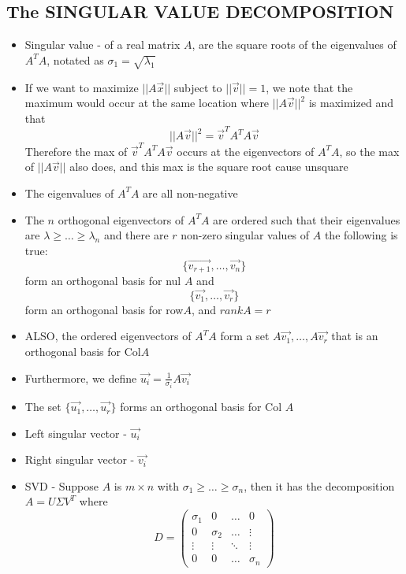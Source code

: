 \documentclass{article}
\begin{document}
\subsection{The SINGULAR VALUE DECOMPOSITION}
\begin{itemize}
    \item Singular value - of a real matrix \(A\), are the square roots of the eigenvalues of \(A^TA\), notated as \(\sigma_1=\sqrt{\lambda_1}\)
    \item If we want to maximize \(||A\vec{x}||\) subject to \(||\vec{v}||=1\), we note that the maximum would occur at the same location where \(||A\vec{v}||^2\) is maximized and that 
    \[||A\vec{v}||^2=\vec{v}^TA^TA\vec{v}\] Therefore the max of \(\vec{v}^TA^TA\vec{v}\) occurs at the eigenvectors of \(A^TA\), so the max of \(||A\vec{v}||\) also does, and this max is the square root cause unsquare
    \item The eigenvalues of \(A^TA\) are all non-negative 
    \item The \(n\) orthogonal eigenvectors of \(A^TA\) are ordered such that their eigenvalues are \(\lambda\geq\dots\geq\lambda_n\) and there are \(r\) non-zero singular values of \(A\) the following is true:
    \[\{\vec{v_{r+1}},\dots,\vec{v_{n}}\}\] form an orthogonal basis for nul \(A\) and \[\{\vec{v_{1}},\dots,\vec{v_{r}}\}\] form an orthogonal basis for row\(A\), and \(rank A=r\)
    \item ALSO, the ordered eigenvectors of \(A^TA\) form a set \(A\vec{v_1},\dots,A\vec{v_r}\) that is an orthogonal basis for Col\(A\) 
    \item Furthermore, we define \(\vec{u_i}=\frac{1}{\sigma_i}A\vec{v_i}\)
    \item The set \(\{\vec{u_{1}},\dots,\vec{u_{r}}\}\) forms an orthogonal basis for Col \(A\) 
    \item Left singular vector - \(\vec{u_i}\)
    \item Right singular vector - \(\vec{v_i}\)
    \item SVD - Suppose \(A\) is \(m\times n\) with \(\sigma_1\geq\dots\geq\sigma_n\), then it has the decomposition \(A=U\Sigma V^T\) where
    \[D=\begin{pmatrix} \sigma_1&0&\dots&0\\ 0&\sigma_2&\dots&\vdots\\\vdots&\vdots&\ddots&\vdots\\0&0&\dots&\sigma_n \end{pmatrix}\]
    \begin{itemize}

\end{itemize}
\end{itemize}
\end{document}

